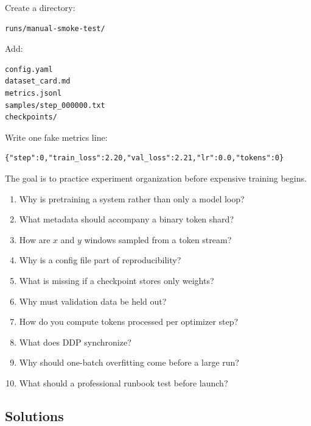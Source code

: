 Create a directory:

\begin{lstlisting}
runs/manual-smoke-test/
\end{lstlisting}

Add:

\begin{lstlisting}
config.yaml
dataset_card.md
metrics.jsonl
samples/step_000000.txt
checkpoints/
\end{lstlisting}

Write one fake metrics line:

\begin{lstlisting}
{"step":0,"train_loss":2.20,"val_loss":2.21,"lr":0.0,"tokens":0}
\end{lstlisting}

The goal is to practice experiment organization before expensive training begins.

\checkpoint

\begin{enumerate}
  \item Why is pretraining a system rather than only a model loop?
  \item What metadata should accompany a binary token shard?
  \item How are \(x\) and \(y\) windows sampled from a token stream?
  \item Why is a config file part of reproducibility?
  \item What is missing if a checkpoint stores only weights?
  \item Why must validation data be held out?
  \item How do you compute tokens processed per optimizer step?
  \item What does DDP synchronize?
  \item Why should one-batch overfitting come before a large run?
  \item What should a professional runbook test before launch?
\end{enumerate}

\subsection*{Solutions}

